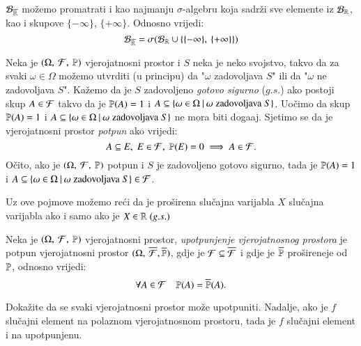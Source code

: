 \begin{nap} \label{nap:3.8.1}
    $\mathcal{B}_{\overline{\mathbb{R}}}$ mo\v zemo promatrati i kao najmanju $\sigma$-algebru koja sadr\v zi sve elemente iz $\mathcal{B}_{\mathbb{R}}$, kao i skupove $\{-\infty\}$, $\{+\infty\}$.
    Odnosno vrijedi:
    \begin{equation*}
        \mathcal{B}_{\overline{\mathbb{R}}} = \sigma({\mathcal{B}_{\mathbb{R}} \cup \{\{-\infty\}, \: \{+\infty\}\}})
    \end{equation*}
\end{nap}

\begin{nap} \label{nap:3.9}
    Neka je $(\Omega, \: \mathcal{F}, \: \mathbb{P})$ vjerojatnosni prostor i $S$ neka je neko svojstvo, takvo da za svaki $\omega \in \Omega$ mo\v zemo utvrditi (u principu) da "$\omega$ zadovoljava $S$" ili da "$\omega$ ne zadovoljava $S$".
    Ka\v zemo da je $S$ zadovoljeno \emph{gotovo sigurno} ($g.s.$) ako postoji skup $A \in \mathcal{F}$ takvo da je $\mathbb{P}({A}) = 1$ i $A \subseteq \{{\omega \in \Omega} \: | \: {\omega \; \textnormal{zadovoljava} \; S}\}$.
    Uo\v cimo da skup $\mathbb{P}({A}) = 1$ i $A \subseteq \{{\omega \in \Omega} \: | \: {\omega \; \textnormal{zadovoljava} \; S}\}$ ne mora biti doga\dj aj.
    Sjetimo se da je vjerojatnosni prostor \emph{potpun} ako vrijedi:
    \begin{equation*}
        A \subseteq E, \; E \in \mathcal{F}, \; \mathbb{P}({E}) = 0 \implies A \in \mathcal{F}.
    \end{equation*}
    O\v cito, ako je $(\Omega, \: \mathcal{F}, \: \mathbb{P})$ potpun i $S$ je zadovoljeno gotovo sigurno, tada je $\mathbb{P}({A}) = 1$ i $A \subseteq \{{\omega \in \Omega} \: | \: {\omega \; \textnormal{zadovoljava} \; S}\} \in \mathcal{F}$.

    Uz ove pojmove mo\v zemo re\' ci da je pro\v sirena slu\v cajna varijabla $X$ slu\v cajna varijabla ako i samo ako je $X \in \mathbb{R} \; (g.s.)$
\end{nap}

\begin{nap} \label{nap:3.9-1}
    Neka je $(\Omega, \: \mathcal{F}, \: \mathbb{P})$ vjerojatnosni prostor, \emph{upotpunjenje vjerojatnosnog prostora} je potpun vjerojatnosni prostor $(\Omega, \: \overline{\mathcal{F}}, \overline{\mathbb{P}})$, gdje je $\mathcal{F} \subseteq \overline{\mathcal{F}}$ i gdje je $\overline{\mathbb{P}}$ pro\v sireneje od $\mathbb{P}$, odnosno vrijedi:
    \begin{equation*}
        \forall A \in \mathcal{F} \quad \mathbb{P}({A}) = \overline{\mathbb{P}}(A).
    \end{equation*}
\end{nap}

\begin{zad} \label{zad:3.10}
    Doka\v zite da se svaki vjerojatnosni prostor mo\v ze upotpuniti.
    Nadalje, ako je $f$ slu\v cajni element na polaznom vjerojatnosnom
    prostoru, tada je $f$ slu\v cajni element i na upotpunjenu.
\end{zad}


